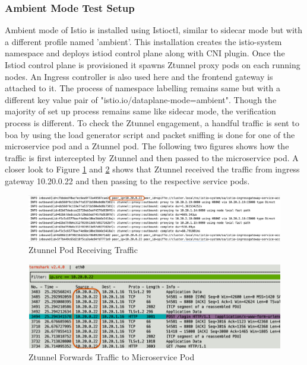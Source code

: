 \subsubsection{Ambient Mode Test Setup}
Ambient mode of Istio is installed using Istioctl, similar to sidecar mode but with a different profile named 'ambient'. This installation creates the istio-system namespace and deploys istiod control plane along with CNI plugin. Once the Istiod control plane is provisioned it spawns Ztunnel proxy pods on each running nodes. An Ingress controller is also used here and the frontend gateway is attached to it. The process of namespace labelling remains same but with a different key value pair of "istio.io/dataplane-mode=ambient". Though the majority of set up process remains same like sidecar mode, the verification process is different. To check the Ztunnel engagement, a handful traffic is sent to \acrshort{boa} by using the load generator script and packet sniffing is done for one of the microservice pod and a Ztunnel pod. The following two figures shows how the traffic is first intercepted by Ztunnel and then passed to the microservice pod. A closer look to Figure \ref{method:ztunnelLogView} and \ref{method:ztunnelTraceView} shows that Ztunnel received the traffic from ingress gateway 10.20.0.22 and then passing to the respective service pods.

\begin{figure}[ht!]
  \centering
  \includegraphics[width=1.0\linewidth]{resources/ztunnel-log.png}
  \caption{Ztunnel Pod Receiving Traffic}
  \label{method:ztunnelLogView}
\end{figure}

\begin{figure}[ht!]
  \centering
  \includegraphics[width=1.0\linewidth]{resources/ztunnel-network-trace.png}
  \caption{Ztunnel Forwards Traffic to Microservice Pod}
  \label{method:ztunnelTraceView}
\end{figure}


